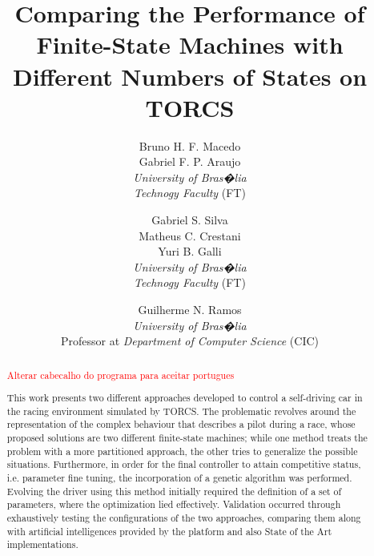 \documentclass[a4paper]{sbgames}               %
\title{Comparing the Performance of Finite-State Machines with Different Numbers of States on TORCS}
\author{Bruno H. F. Macedo\\Gabriel F. P. Araujo\\ \textit{University of Bras�lia}\\ \textit{Technogy Faculty} (FT)\\
        \and Gabriel S. Silva\\Matheus C. Crestani\\Yuri B. Galli\\ \textit{University of Bras�lia}\\
        \textit{Technogy Faculty} (FT)\\
        \and Guilherme N. Ramos\\ \textit{University of Bras�lia}\\Professor at
        \textit{Department of Computer Science} (CIC)\\
}
\newcommand{\toDo}[1]{\textcolor{red}{#1}}
\begin{document}


\maketitle


	\begin{abstract}
		
		\toDo{Alterar cabecalho do programa para aceitar portugues}
		
		This work presents two different approaches developed to control a self-driving car in the racing environment
		simulated by TORCS. The problematic revolves around the representation of the complex behaviour that
		describes a pilot during a race, whose proposed solutions are two different finite-state machines; while one
		method treats the problem with a more partitioned approach, the other tries to generalize the possible
		situations.	Furthermore, in order for the final controller to attain competitive status, i.e. parameter fine
		tuning, the	incorporation of a genetic algorithm was performed. Evolving the driver using this method
		initially required the definition of a set of parameters, where the optimization lied effectively. Validation
		occurred through exhaustively testing the configurations of the two approaches, comparing them along with
		artificial intelligences provided by the platform and also State of the Art implementations.
		
	\end{abstract}

	\keywordlist
	\contactlist
	
\end{document}
